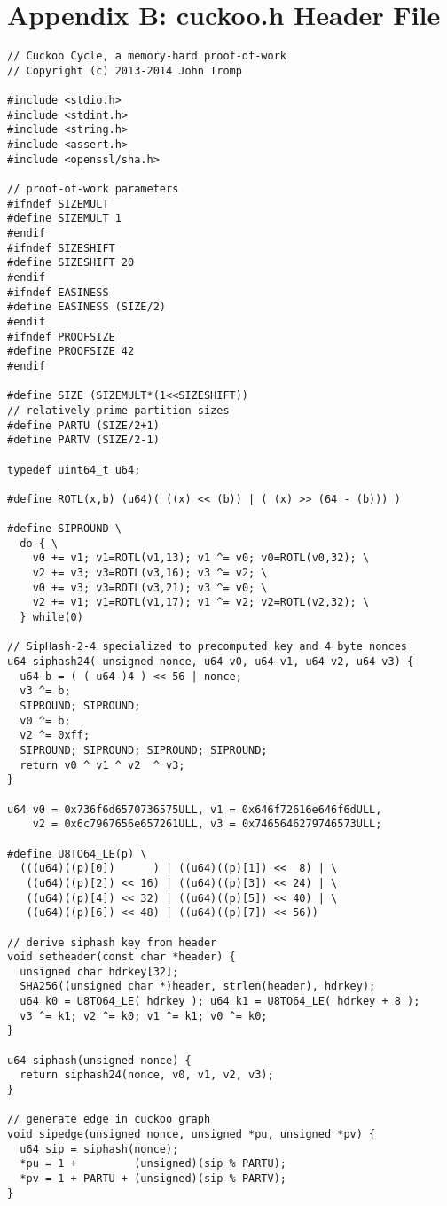 \documentclass[11pt, oneside]{article}
\begin{document}
\section{Appendix B: cuckoo.h Header File}
\footnotesize
\begin{verbatim}
// Cuckoo Cycle, a memory-hard proof-of-work
// Copyright (c) 2013-2014 John Tromp

#include <stdio.h>
#include <stdint.h>
#include <string.h>
#include <assert.h>
#include <openssl/sha.h>

// proof-of-work parameters
#ifndef SIZEMULT 
#define SIZEMULT 1
#endif
#ifndef SIZESHIFT 
#define SIZESHIFT 20
#endif
#ifndef EASINESS 
#define EASINESS (SIZE/2)
#endif
#ifndef PROOFSIZE 
#define PROOFSIZE 42
#endif

#define SIZE (SIZEMULT*(1<<SIZESHIFT))
// relatively prime partition sizes
#define PARTU (SIZE/2+1)
#define PARTV (SIZE/2-1)

typedef uint64_t u64;
 
#define ROTL(x,b) (u64)( ((x) << (b)) | ( (x) >> (64 - (b))) )
 
#define SIPROUND \
  do { \
    v0 += v1; v1=ROTL(v1,13); v1 ^= v0; v0=ROTL(v0,32); \
    v2 += v3; v3=ROTL(v3,16); v3 ^= v2; \
    v0 += v3; v3=ROTL(v3,21); v3 ^= v0; \
    v2 += v1; v1=ROTL(v1,17); v1 ^= v2; v2=ROTL(v2,32); \
  } while(0)
 
// SipHash-2-4 specialized to precomputed key and 4 byte nonces
u64 siphash24( unsigned nonce, u64 v0, u64 v1, u64 v2, u64 v3) {
  u64 b = ( ( u64 )4 ) << 56 | nonce;
  v3 ^= b;
  SIPROUND; SIPROUND;
  v0 ^= b;
  v2 ^= 0xff;
  SIPROUND; SIPROUND; SIPROUND; SIPROUND;
  return v0 ^ v1 ^ v2  ^ v3;
}

u64 v0 = 0x736f6d6570736575ULL, v1 = 0x646f72616e646f6dULL,
    v2 = 0x6c7967656e657261ULL, v3 = 0x7465646279746573ULL;

#define U8TO64_LE(p) \
  (((u64)((p)[0])      ) | ((u64)((p)[1]) <<  8) | \
   ((u64)((p)[2]) << 16) | ((u64)((p)[3]) << 24) | \
   ((u64)((p)[4]) << 32) | ((u64)((p)[5]) << 40) | \
   ((u64)((p)[6]) << 48) | ((u64)((p)[7]) << 56))
 
// derive siphash key from header
void setheader(const char *header) {
  unsigned char hdrkey[32];
  SHA256((unsigned char *)header, strlen(header), hdrkey);
  u64 k0 = U8TO64_LE( hdrkey ); u64 k1 = U8TO64_LE( hdrkey + 8 );
  v3 ^= k1; v2 ^= k0; v1 ^= k1; v0 ^= k0;
}

u64 siphash(unsigned nonce) {
  return siphash24(nonce, v0, v1, v2, v3);
}

// generate edge in cuckoo graph
void sipedge(unsigned nonce, unsigned *pu, unsigned *pv) {
  u64 sip = siphash(nonce);
  *pu = 1 +         (unsigned)(sip % PARTU);
  *pv = 1 + PARTU + (unsigned)(sip % PARTV);
}
\end{verbatim}
\end{document}
